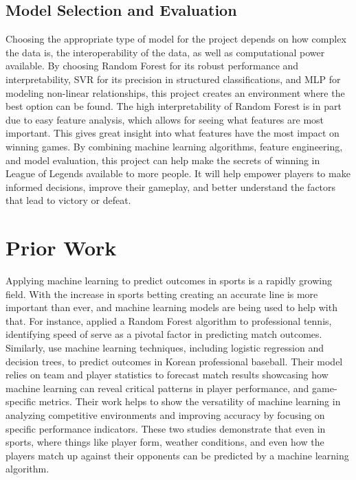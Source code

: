 \documentclass[10pt,twocolumn]{article}
\begin{document}
\subsection{Model Selection and Evaluation}
Choosing the appropriate type of model for the project depends on how complex the data is, the interoperability of the data, as well as computational power available. By choosing Random Forest for its robust performance and interpretability, SVR for its precision in structured classifications, and MLP for modeling non-linear relationships, this project creates an environment where the best option can be found. The high interpretability of Random Forest is in part due to easy feature analysis, which allows for seeing what features are most important. This gives great insight into what features have the most impact on winning games.
By combining machine learning algorithms, feature engineering, and model evaluation, this project can help make the secrets of winning in League of Legends available to more people. It will help empower players to make informed decisions, improve their gameplay, and better understand the factors that lead to victory or defeat.





\section{Prior Work}

Applying machine learning to predict outcomes in sports is a rapidly growing field. With the increase in sports betting creating an accurate line is more important than ever, and machine learning models are being used to help with that. For instance, \cite{Gao2021} applied a Random Forest algorithm to professional tennis, identifying speed of serve as a pivotal factor in predicting match outcomes. Similarly, \cite{SeoYeong-Jin2019} use machine learning techniques, including logistic regression and decision trees, to predict outcomes in Korean professional baseball. Their model relies on team and player statistics to forecast match results  showcasing how machine learning can reveal critical patterns in player performance, and game-specific metrics. Their work helps to show the versatility of machine learning in analyzing competitive environments and improving accuracy by focusing on specific performance indicators. These two studies demonstrate that even in sports, where things like player form, weather conditions, and even how the players match up against their opponents can be predicted by a machine learning algorithm.
\end{document}
